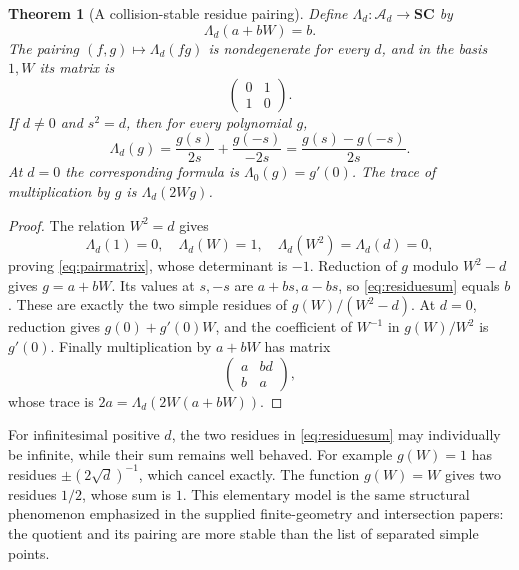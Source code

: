 \documentclass[11pt,letterpaper]{article}
\newtheorem{theorem}{Theorem}[section]
\theoremstyle{definition}
\theoremstyle{remark}
\newcommand{\SC}{\mathbf{SC}}
\numberwithin{equation}{section}
\begin{document}
\begin{theorem}[A collision-stable residue pairing]\label{thm:residuepairing}
Define $\Lambda_d:\mathcal A_d\to\SC$ by
\[
 \Lambda_d(a+bW)=b.
\]
The pairing $(f,g)\mapsto\Lambda_d(fg)$ is nondegenerate for every $d$, and in the basis $1,W$ its matrix is
\begin{equation}\label{eq:pairmatrix}
 \begin{pmatrix}0&1\\1&0\end{pmatrix}.
\end{equation}
If $d\ne0$ and $s^2=d$, then for every polynomial $g$,
\begin{equation}\label{eq:residuesum}
 \Lambda_d(g)=\frac{g(s)}{2s}+\frac{g(-s)}{-2s}
 =\frac{g(s)-g(-s)}{2s}.
\end{equation}
At $d=0$ the corresponding formula is $\Lambda_0(g)=g'(0)$. The trace of multiplication by $g$ is $\Lambda_d(2Wg)$.
\end{theorem}
\begin{proof}
The relation $W^2=d$ gives
\[
 \Lambda_d(1)=0,\quad\Lambda_d(W)=1,\quad\Lambda_d(W^2)=\Lambda_d(d)=0,
\]
proving \eqref{eq:pairmatrix}, whose determinant is $-1$. Reduction of $g$ modulo $W^2-d$ gives $g=a+bW$. Its values at $s,-s$ are $a+bs,a-bs$, so \eqref{eq:residuesum} equals $b$. These are exactly the two simple residues of $g(W)/(W^2-d)$. At $d=0$, reduction gives $g(0)+g'(0)W$, and the coefficient of $W^{-1}$ in $g(W)/W^2$ is $g'(0)$. Finally multiplication by $a+bW$ has matrix
\[
 \begin{pmatrix}a&bd\\b&a\end{pmatrix},
\]
whose trace is $2a=\Lambda_d(2W(a+bW))$.
\end{proof}
For infinitesimal positive $d$, the two residues in \eqref{eq:residuesum} may individually be infinite, while their sum remains well behaved. For example $g(W)=1$ has residues $\pm(2\sqrt d)^{-1}$, which cancel exactly. The function $g(W)=W$ gives two residues $1/2$, whose sum is $1$. This elementary model is the same structural phenomenon emphasized in the supplied finite-geometry and intersection papers: the quotient and its pairing are more stable than the list of separated simple points.
\end{document}
